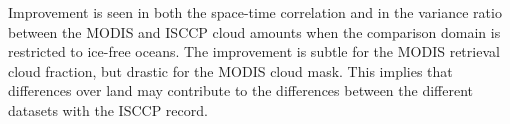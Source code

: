 Improvement is seen in both the space-time correlation and in the variance ratio between the MODIS and ISCCP cloud amounts when the comparison domain is restricted to ice-free oceans. The improvement is subtle for the MODIS retrieval cloud fraction, but drastic for the MODIS cloud mask. This implies that differences over land may contribute to the differences between the different datasets with the ISCCP record.
